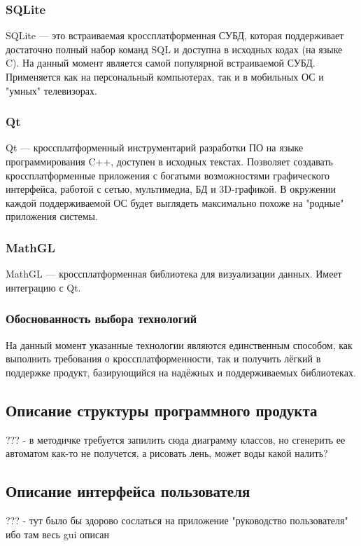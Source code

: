 \subsubsection{SQLite}
SQLite — это встраиваемая кроссплатформенная СУБД, которая поддерживает достаточно полный набор команд SQL и доступна в исходных кодах (на языке C). На данный
момент является самой популярной встраиваемой СУБД. Применяется как на персональный компьютерах, так и в мобильных ОС и "умных" телевизорах.

\subsubsection{Qt}
Qt — кроссплатформенный инструментарий разработки ПО на языке программирования C++, доступен в исходных текстах. Позволяет создавать кроссплатформенные приложения с богатыми возможностями
графического интерфейса, работой с сетью, мультимедиа, БД и 3D-графикой. В окружении каждой поддерживаемой ОС будет выглядеть максимально похоже на "родные" приложения
системы.

\subsubsection{MathGL}
MathGL — кроссплатформенная библиотека для визуализации данных. Имеет интеграцию с Qt.

\subsubsection{Обоснованность выбора технологий}
На данный момент указанные технологии являются единственным способом, как выполнить требования о кроссплатформенности, так и получить лёгкий в поддержке
продукт, базирующийся на надёжных и поддерживаемых библиотеках.

\subsection{Описание структуры программного продукта}
??? - в методичке требуется запилить сюда диаграмму классов, но сгенерить ее автоматом как-то не получется, а рисовать лень, может воды какой налить?

\subsection{Описание интерфейса пользователя}
??? - тут было бы здорово сослаться на приложение "руководство пользователя" ибо там весь gui описан
